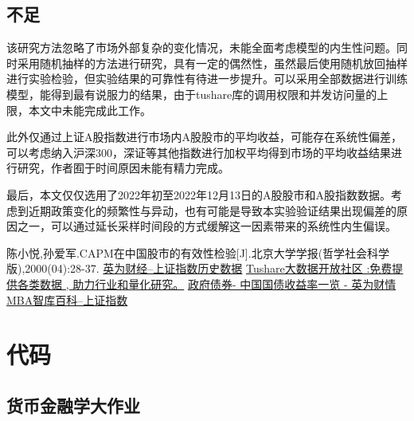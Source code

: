 \documentclass{xjtureport}
\begin{document}
\subsection{不足}
该研究方法忽略了市场外部复杂的变化情况，未能全面考虑模型的内生性问题。同时采用随机抽样的方法进行研究，具有一定的偶然性，虽然最后使用随机放回抽样进行实验检验，但实验结果的可靠性有待进一步提升。可以采用全部数据进行训练模型，能得到最有说服力的结果，由于tushare库的调用权限和并发访问量的上限，本文中未能完成此工作。
\par 此外仅通过上证A股指数进行市场内A股股市的平均收益，可能存在系统性偏差，可以考虑纳入沪深300，深证等其他指数进行加权平均得到市场的平均收益结果进行研究，作者囿于时间原因未能有精力完成。
\par 最后，本文仅仅选用了2022年初至2022年12月13日的A股股市和A股指数数据。考虑到近期政策变化的频繁性与异动，也有可能是导致本实验验证结果出现偏差的原因之一，可以通过延长采样时间段的方式缓解这一因素带来的系统性内生偏误。
\begin{thebibliography}{99}  
     陈小悦,孙爱军.CAPM在中国股市的有效性检验[J].北京大学学报(哲学社会科学版),2000(04):28-37.
     \href{https://cn.investing.com/indices/shanghai-composite-historical-data}{英为财经--上证指数历史数据}
     \href{https://tushare.pro/}{Tushare大数据开放社区
    :免费提供各类数据 , 助力行业和量化研究。}
     \href{https://cn.investing.com/rates-bonds/china-government-bonds}{政府债券- 中国国债收益率一览 - 英为财情}
     \href{https://wiki.mbalib.com/wiki/%E4%B8%8A%E8%AF%81%E6%8C%87%E6%95%B0}{MBA智库百科--上证指数}
\end{thebibliography}
\section*{代码}
\subsection*{货币金融学大作业}


\end{document}
